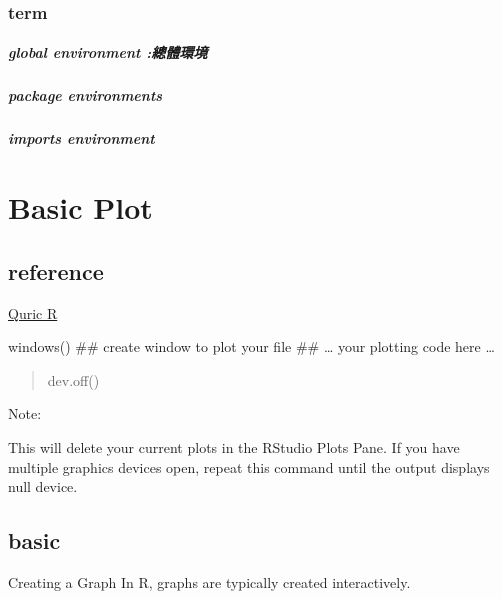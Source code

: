 \documentclass[]{book}
\let\oldparagraph\paragraph
\renewcommand{\paragraph}[1]{\oldparagraph{#1}\mbox{}}
\theoremstyle{definition}
\theoremstyle{definition}
\theoremstyle{definition}
\theoremstyle{remark}
\begin{document}
\hypertarget{term}{%
\subsection{term}\label{term}}

\hypertarget{global-environment}{%
\paragraph{global environment :總體環境}\label{global-environment}}

\hypertarget{package-environments}{%
\paragraph{package environments}\label{package-environments}}

\hypertarget{imports-environment}{%
\paragraph{imports environment}\label{imports-environment}}

\hypertarget{basic-plot}{%
\chapter{Basic Plot}\label{basic-plot}}

\hypertarget{reference-1}{%
\section{reference}\label{reference-1}}

\href{https://www.statmethods.net/graphs/creating.html}{Quric R}

windows() \#\# create window to plot your file \#\# \ldots{} your
plotting code here \ldots{}

\begin{quote}
dev.off()
\end{quote}

Note:

This will delete your current plots in the RStudio Plots Pane. If you
have multiple graphics devices open, repeat this command until the
output displays null device.

\hypertarget{basic}{%
\section{basic}\label{basic}}

Creating a Graph In R, graphs are typically created interactively.
\end{document}
